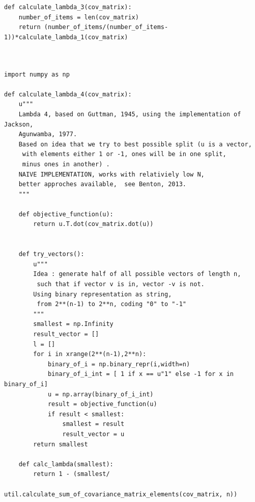 \documentclass[a4paper,12pt,oneside]{article}
\newenvironment{customFloatWrap}{}{}
\numberwithin{equation}{section}
\theoremstyle{definition}
\begin{document}
\begin{subappendices}
\begin{customFloatWrap}
\begin{verbatim}
def calculate_lambda_3(cov_matrix):
    number_of_items = len(cov_matrix)
    return (number_of_items/(number_of_items-1))*calculate_lambda_1(cov_matrix)      
  
\end{verbatim}
\end{customFloatWrap}

\vspace{10pt}
        
\begin{customFloatWrap}
\begin{verbatim}

import numpy as np

def calculate_lambda_4(cov_matrix):
    u"""
    Lambda 4, based on Guttman, 1945, using the implementation of Jackson,
    Agunwamba, 1977.
    Based on idea that we try to best possible split (u is a vector,
     with elements either 1 or -1, ones will be in one split, 
     minus ones in another) .
    NAIVE IMPLEMENTATION, works with relativiely low N, 
    better approches available,  see Benton, 2013.
    """
    
    def objective_function(u):
        return u.T.dot(cov_matrix.dot(u))

    
    def try_vectors():
        u"""
        Idea : generate half of all possible vectors of length n,
         such that if vector v is in, vector -v is not. 
        Using binary representation as string,
         from 2**(n-1) to 2**n, coding "0" to "-1"
        """
        smallest = np.Infinity
        result_vector = []
        l = []
        for i in xrange(2**(n-1),2**n):
            binary_of_i = np.binary_repr(i,width=n)
            binary_of_i_int = [ 1 if x == u"1" else -1 for x in binary_of_i]
            u = np.array(binary_of_i_int)
            result = objective_function(u)
            if result < smallest:
                smallest = result
                result_vector = u
        return smallest
             
    def calc_lambda(smallest):
        return 1 - (smallest/
            util.calculate_sum_of_covariance_matrix_elements(cov_matrix, n))
        

\end{verbatim}
\end{customFloatWrap}
\end{subappendices}
\end{document}
